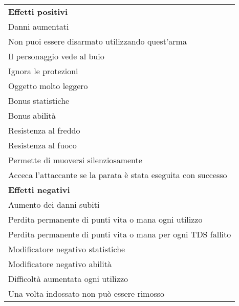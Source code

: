 \documentclass[../manuale_main.tex]{subfiles}
\begin{document}
\begin{tabular}{l}
\textbf{Effetti positivi} \\
    Danni aumentati      \\
Non puoi essere disarmato utilizzando quest'arma\\
Il personaggio vede al buio \\
Ignora le protezioni \\
Oggetto molto leggero\\
Bonus statistiche\\ 
Bonus abilità \\
Resistenza al freddo \\
Resistenza al fuoco\\
Permette di muoversi silenziosamente \\
Acceca l'attaccante se la parata è stata eseguita con successo\\

\textbf{Effetti negativi} \\
Aumento dei danni subiti \\
 Perdita permanente di punti vita o mana ogni utilizzo\\
Perdita permanente di punti vita o mana per ogni TDS fallito\\
 Modificatore negativo statistiche\\
 Modificatore negativo abilità \\
Difficoltà aumentata ogni utilizzo\\
Una volta indossato non può essere rimosso\\
             
\end{tabular}
\end{document}
